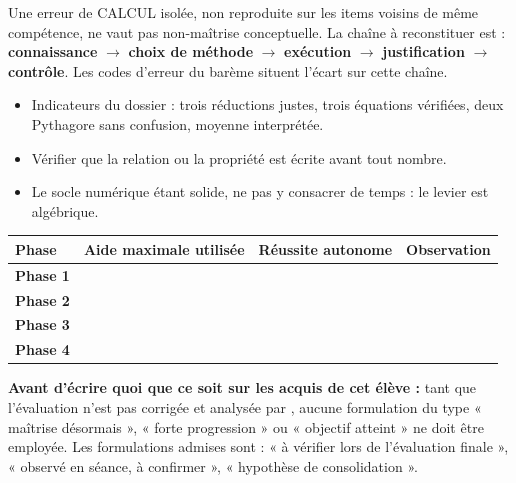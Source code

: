 \documentclass[10pt,a4paper]{article}
\begin{document}
Une erreur de \textsc{CALCUL} isolée, non reproduite sur les items voisins de même compétence, ne vaut pas non-maîtrise conceptuelle. La chaîne à reconstituer est : \textbf{connaissance} $\rightarrow$ \textbf{choix de méthode} $\rightarrow$ \textbf{exécution} $\rightarrow$ \textbf{justification} $\rightarrow$ \textbf{contrôle}. Les codes d'erreur du barème situent l'écart sur cette chaîne.
\begin{itemize}\item Indicateurs du dossier : trois réductions justes, trois équations vérifiées, deux Pythagore sans confusion, moyenne interprétée.\item Vérifier que la relation ou la propriété est écrite avant tout nombre.\item Le socle numérique étant solide, ne pas y consacrer de temps : le levier est algébrique.\end{itemize}
\par\noindent\begin{tabularx}{\linewidth}{>{\bfseries}p{26mm} X X X}
\toprule Phase & Aide maximale utilisée & Réussite autonome & Observation \\ \midrule
Phase 1 & & & \\[6mm]
Phase 2 & & & \\[6mm]
Phase 3 & & & \\[6mm]
Phase 4 & & & \\[6mm]
\bottomrule\end{tabularx}
\begin{warningbox}\textbf{Avant d'écrire quoi que ce soit sur les acquis de cet élève :} tant que l'évaluation n'est pas corrigée et analysée par , aucune formulation du type « maîtrise désormais », « forte progression » ou « objectif atteint » ne doit être employée. Les formulations admises sont : « à vérifier lors de l'évaluation finale », « observé en séance, à confirmer », « hypothèse de consolidation ».\end{warningbox}
\end{document}
